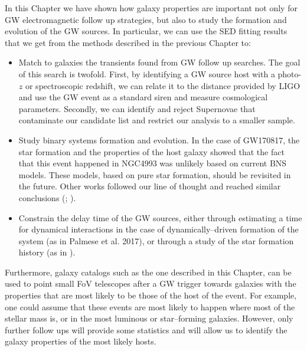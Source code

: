 In this Chapter we have shown how galaxy properties are important not only for GW electromagnetic follow up strategies, but also to study the formation and evolution of the GW sources. In particular, we can use the SED fitting results that we get from the methods described in the previous Chapter to:
\begin{itemize}
\item Match to galaxies the transients found from GW follow up searches. The goal of this search is twofold. First, by identifying a GW source host with a photo-$z$ or spectroscopic redshift, we can relate it to the distance provided by LIGO and use the GW event as a standard siren and measure cosmological parameters. Secondly, we can identify and reject Supernovae that contaminate our candidate list and restrict our analysis to a smaller sample.
\item Study binary systems formation and evolution. In the case of GW170817, the star formation and the properties of the host galaxy showed that the fact that this event happened in NGC4993 was unlikely based on current BNS models. These models, based on pure star formation, should be revisited in the future. Other works followed our line of thought and reached similar conclusions (\citealt{Belczynski}; \citealt{ebrova}).
\item Constrain the delay time of the GW sources, either through estimating a time for dynamical interactions in the case of dynamically--driven formation of the system (as in Palmese et al. 2017), or through a study of the star formation history (as in \citealt{blanchard}).
\end{itemize}

Furthermore, galaxy catalogs such as the one described in this Chapter, can be used to point small FoV telescopes after a GW trigger towards galaxies with the properties that are most likely to be those of the host of the event. For example, one could assume that these events are most likely to happen where most of the stellar mass is, or in the most luminous or star--forming galaxies. However, only further follow ups will provide some statistics and will allow us to identify the galaxy properties of the most likely hosts.






